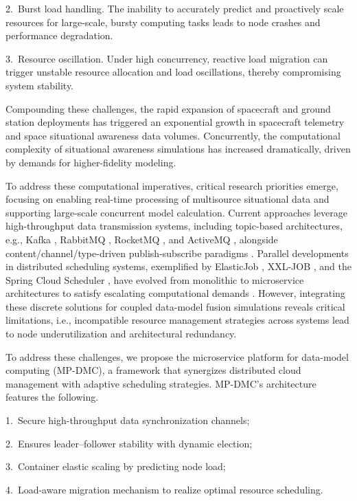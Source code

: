 \documentclass[twoside,twocolumn]{article}
\begin{document}
2.~Burst load handling. The inability to accurately predict and proactively scale resources for large-scale, bursty computing tasks leads to node crashes and performance degradation.

3.~Resource oscillation. Under high concurrency, reactive load migration can trigger unstable resource allocation and load oscillations, thereby compromising system stability.

Compounding these challenges, the rapid expansion of spacecraft and ground station deployments has triggered an exponential growth in spacecraft telemetry and space situational awareness data volumes. Concurrently, the computational complexity of situational awareness simulations has increased dramatically, driven by demands for higher-fidelity modeling.

To address these computational imperatives, critical research priorities emerge, focusing on enabling real-time processing of multisource situational data and supporting large-scale concurrent model calculation. Current approaches leverage high-throughput data transmission systems, including topic-based architectures, e.g., Kafka \citep{Wei2025}, RabbitMQ \citep{Pathak2021}, RocketMQ \citep{MaY2017}, and ActiveMQ \citep{Yin2015}, alongside content/channel/type-driven publish-subscribe paradigms \citep{Ding2020,Yang2004,Dayal2014}. Parallel developments in distributed scheduling systems, exemplified by ElasticJob \citep{LiuF2015}, XXL-JOB \citep{Xu2015}, and the Spring Cloud Scheduler \citep{Pivotal2018}, have evolved from monolithic to microservice architectures to satisfy escalating computational demands \citep{Feng2020,Dragoni2017}. However, integrating these discrete solutions for coupled data-model fusion simulations reveals critical limitations, i.e., incompatible resource management strategies across systems lead to node underutilization and architectural redundancy.

To address these challenges, we propose the microservice platform for data-model computing (MP-DMC), a framework that synergizes distributed cloud management with adaptive scheduling strategies. MP-DMC's architecture features the following.

1.~Secure high-throughput data synchronization channels;

2.~Ensures leader--follower stability with dynamic election;

3.~Container elastic scaling by predicting node load;

4.~Load-aware migration mechanism to realize optimal resource scheduling.
\end{document}
